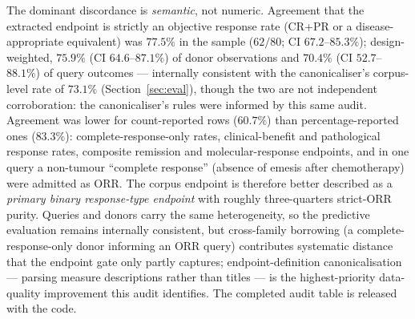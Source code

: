 \documentclass[11pt]{article}
\begin{document}
The dominant discordance is \emph{semantic}, not numeric. Agreement that the
extracted endpoint is strictly an objective response rate (CR+PR or a
disease-appropriate equivalent) was $77.5\%$ in the sample ($62/80$; CI
$67.2$--$85.3\%$); design-weighted, $75.9\%$ (CI $64.6$--$87.1\%$) of donor
observations and $70.4\%$ (CI $52.7$--$88.1\%$) of query outcomes ---
internally consistent with the canonicaliser's corpus-level rate of
$73.1\%$ (Section~\ref{sec:eval}), though the two are not independent
corroboration: the canonicaliser's rules were informed by this same
audit. Agreement was
lower for count-reported rows ($60.7\%$) than percentage-reported ones
($83.3\%$): complete-response-only rates, clinical-benefit and pathological
response rates, composite remission and molecular-response endpoints, and in
one query a non-tumour ``complete response'' (absence of emesis after
chemotherapy) were admitted as ORR. The corpus endpoint is therefore better
described as a \emph{primary binary response-type endpoint} with roughly
three-quarters strict-ORR purity. Queries and donors carry the same heterogeneity,
so the predictive evaluation remains internally consistent, but
cross-family borrowing (a complete-response-only donor informing an ORR
query) contributes systematic distance that the endpoint gate only partly
captures; endpoint-definition canonicalisation --- parsing measure
descriptions rather than titles --- is the highest-priority data-quality
improvement this audit identifies. The completed audit table is released
with the code.
\end{document}
